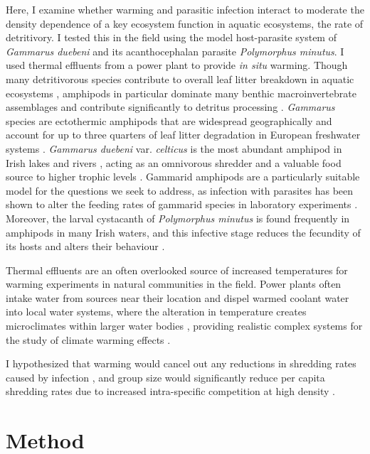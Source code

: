 Here, I examine whether warming and parasitic infection interact to moderate the density dependence of a key ecosystem function in aquatic ecosystems, the rate of detritivory. I tested this in the field using the model host-parasite system of \emph{Gammarus duebeni} and its acanthocephalan parasite \emph{Polymorphus minutus}. I used thermal effluents from a power plant to provide \emph{in situ} warming. Though many detritivorous species contribute to overall leaf litter breakdown in aquatic ecosystems \citep{tonin2018}, amphipods in particular dominate many benthic macroinvertebrate assemblages and contribute significantly to detritus processing \citep{little2018}. \emph{Gammarus} species are ectothermic amphipods that are widespread geographically and account for up to three quarters of leaf litter degradation in European freshwater systems \citep{piscart2011}. \emph{Gammarus duebeni} var. \emph{celticus} is the most abundant amphipod in Irish lakes and rivers \citep{reid1938}, acting as an omnivorous shredder and a valuable food source to higher trophic levels \citep{kelly2002}. Gammarid amphipods are a particularly suitable model for the questions we seek to address, as infection with parasites has been shown to alter the feeding rates of gammarid species in laboratory experiments \citep{bunke2015, labaude2016, laverty2017, Chapter 4}. Moreover, the larval cystacanth of \emph{Polymorphus minutus} is found frequently in amphipods in many Irish waters, and this infective stage reduces the fecundity of its hosts and alters their behaviour \citep{bailly2017}. 

Thermal effluents are an often overlooked source of increased temperatures for warming experiments in natural communities in the field. Power plants often intake water from sources near their location and dispel warmed coolant water into local water systems, where the alteration in temperature creates microclimates within larger water bodies \citep{aho1982, hoglund1990}, providing realistic complex systems for the study of climate warming effects \citep{raptis2016}. 

I hypothesized that warming would cancel out any reductions in shredding rates caused by infection \citep{labaude2016}, and group size would significantly reduce per capita shredding rates due to increased intra-specific competition at high density \citep{vandervorste2017}.

\section{Method}

